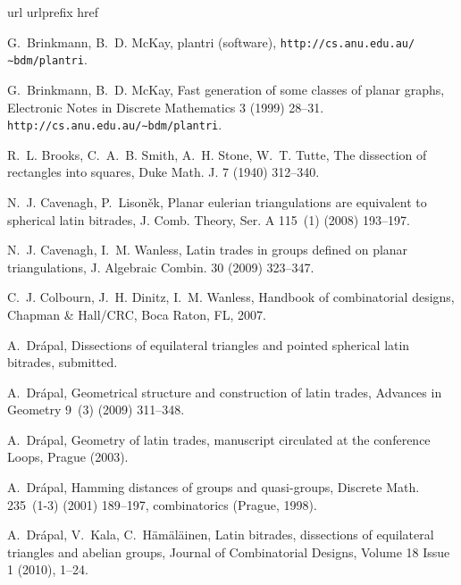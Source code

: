 \documentclass[12pt,amstags,fleqn]{article}
\theoremstyle{plain}
\theoremstyle{definition}
\begin{document}
\clearpage

%
%

\begin{thebibliography}{10}
\expandafter\ifx\csname url\endcsname\relax
  \def\url#1{\texttt{#1}}\fi
\expandafter\ifx\csname urlprefix\endcsname\relax\def\urlprefix{URL }\fi
\expandafter\ifx\csname href\endcsname\relax
  \def\href#1#2{#2} \def\path#1{#1}\fi

G.~Brinkmann, B.~D. McKay, plantri (software),
  \url{http://cs.anu.edu.au/∼bdm/plantri}.

G.~Brinkmann, B.~D. McKay, Fast generation of some classes of planar
graphs, Electronic Notes in Discrete Mathematics 3 (1999) 28--31.
  \url{http://cs.anu.edu.au/∼bdm/plantri}.

R.~L. Brooks, C.~A.~B. Smith, A.~H. Stone, W.~T. Tutte, The dissection of
  rectangles into squares, Duke Math. J. 7 (1940) 312--340.

N.~J. Cavenagh, P.~Lison\v ek, Planar eulerian triangulations are equivalent to
  spherical latin bitrades, J. Comb. Theory, Ser. A 115~(1) (2008) 193--197.

N.~J. Cavenagh, I.~M. Wanless, Latin trades in groups defined on planar
  triangulations, J. Algebraic Combin. 30 (2009) 323--347.

C.~J. Colbourn, J.~H. Dinitz, I.~M. Wanless, Handbook of combinatorial designs,
  Chapman \& Hall/CRC, Boca Raton, FL, 2007.

A.~Dr{\'a}pal, Dissections of equilateral triangles and pointed spherical latin
  bitrades, submitted.

A.~Dr{\'a}pal, Geometrical structure and construction of latin trades, Advances
  in Geometry 9~(3) (2009) 311--348.

A.~Dr{\'a}pal, Geometry of latin trades, manuscript circulated at the
  conference Loops, Prague (2003).

A.~Dr{\'a}pal, Hamming distances of groups and quasi-groups, Discrete Math.
  235~(1-3) (2001) 189--197, combinatorics (Prague, 1998).

A.~Dr{\'a}pal, V.~Kala, C.~H\"{a}m\"{a}l\"{a}inen, Latin bitrades,
  dissections of equilateral triangles and abelian groups,
  Journal of Combinatorial Designs, Volume 18 Issue 1 (2010), 1--24.


\end{thebibliography}
\end{document}

